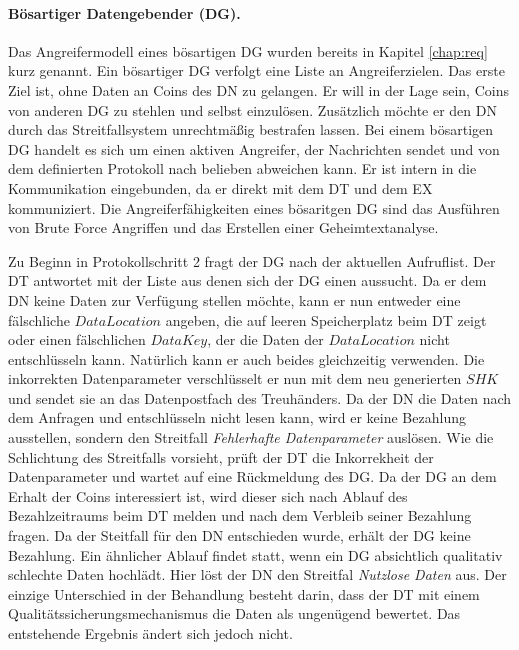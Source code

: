 \documentclass[
	fontsize=11pt,
	headings=small,
	parskip=half,           %
	bibliography=totoc,
	numbers=noenddot,       %
	open=any,               %
]{scrreprt}
\begin{document}
\paragraph{Bösartiger Datengebender (DG).}
Das Angreifermodell eines bösartigen DG wurden bereits in Kapitel \ref{chap:req} kurz genannt. Ein bösartiger DG verfolgt eine Liste an Angreiferzielen. Das erste Ziel ist, ohne Daten an Coins des DN zu gelangen. Er will in der Lage sein, Coins von anderen DG zu stehlen und selbst einzulösen. Zusätzlich möchte er den DN durch das Streitfallsystem unrechtmäßig bestrafen lassen. Bei einem bösartigen DG handelt es sich um einen aktiven Angreifer, der Nachrichten sendet und von dem definierten Protokoll nach belieben abweichen kann. Er ist intern in die Kommunikation eingebunden, da er direkt mit dem DT und dem EX kommuniziert. Die Angreiferfähigkeiten eines bösaritgen DG sind das Ausführen von Brute Force Angriffen und das Erstellen einer Geheimtextanalyse.

Zu Beginn in Protokollschritt 2 fragt der DG nach der aktuellen Aufruflist. Der DT antwortet mit der Liste aus denen sich der DG einen aussucht. Da er dem DN keine Daten zur Verfügung stellen möchte, kann er nun entweder eine fälschliche $DataLocation$ angeben, die auf leeren Speicherplatz beim DT zeigt oder einen fälschlichen $DataKey$, der die Daten der $DataLocation$ nicht entschlüsseln kann. Natürlich kann er auch beides gleichzeitig verwenden. Die inkorrekten Datenparameter verschlüsselt er nun mit dem neu generierten $SHK$ und sendet sie an das Datenpostfach des Treuhänders. Da der DN die Daten nach dem Anfragen und entschlüsseln nicht lesen kann, wird er keine Bezahlung ausstellen, sondern den Streitfall \textit{Fehlerhafte Datenparameter} auslösen. Wie die Schlichtung des Streitfalls vorsieht, prüft der DT die Inkorrekheit der Datenparameter und wartet auf eine Rückmeldung des DG. Da der DG an dem Erhalt der Coins interessiert ist, wird dieser sich nach Ablauf des Bezahlzeitraums beim DT melden und nach dem Verbleib seiner Bezahlung fragen. Da der Steitfall für den DN entschieden wurde, erhält der DG keine Bezahlung. Ein ähnlicher Ablauf findet statt, wenn ein DG absichtlich qualitativ schlechte Daten hochlädt. Hier löst der DN den Streitfal \textit{Nutzlose Daten} aus. Der einzige Unterschied in der Behandlung besteht darin, dass der DT mit einem Qualitätssicherungsmechanismus die Daten als ungenügend bewertet. Das entstehende Ergebnis ändert sich jedoch nicht.
\end{document}
